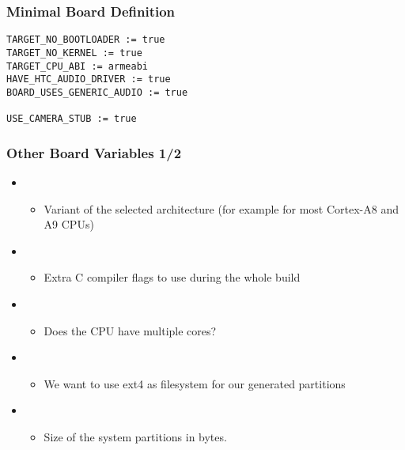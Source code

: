 \begin{frame}[fragile]
  \frametitle{Minimal Board Definition}
\begin{verbatim}
TARGET_NO_BOOTLOADER := true
TARGET_NO_KERNEL := true
TARGET_CPU_ABI := armeabi
HAVE_HTC_AUDIO_DRIVER := true
BOARD_USES_GENERIC_AUDIO := true

USE_CAMERA_STUB := true
\end{verbatim}
\end{frame}

\begin{frame}
  \frametitle{Other Board Variables 1/2}
  \begin{itemize}
  \item {}
    \begin{itemize}
    \item Variant of the selected architecture (for example
       for most Cortex-A8 and A9 CPUs)
    \end{itemize}
  \item {}
    \begin{itemize}
    \item Extra C compiler flags to use during the whole build
    \end{itemize}
  \item {}
    \begin{itemize}
    \item Does the CPU have multiple cores?
    \end{itemize}
  \item {}
    \begin{itemize}
    \item We want to use ext4 as filesystem for our generated
      partitions
    \end{itemize}
  \item {}
    \begin{itemize}
    \item Size of the system partitions in bytes.
    \end{itemize}
  \end{itemize}
\end{frame}


